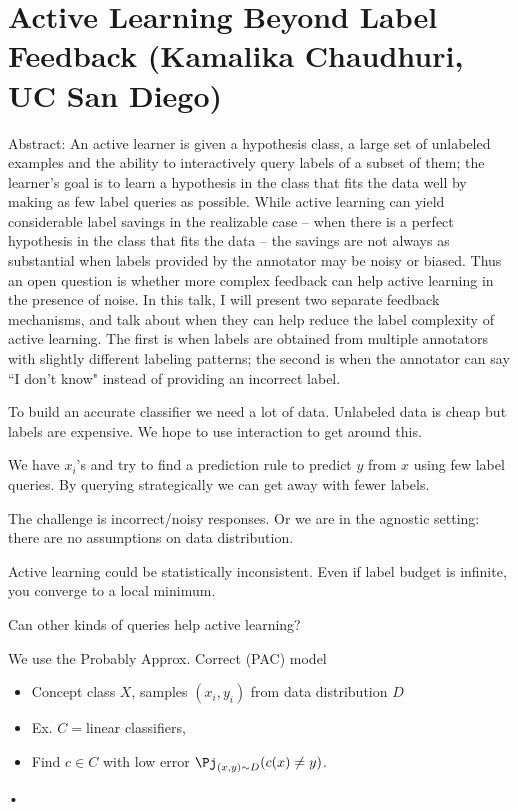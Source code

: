 \section{Active Learning Beyond Label Feedback (Kamalika Chaudhuri, UC San Diego)}

Abstract: An active learner is given a hypothesis class, a large set of unlabeled examples and the ability to interactively query labels of a subset of them; the learner's goal is to learn a hypothesis in the class that fits the data well by making as few label queries as possible. While active learning can yield considerable label savings in the realizable case -- when there is a perfect hypothesis in the class that fits the data -- the savings are not always as substantial when labels provided by the annotator may be noisy or biased. Thus an open question is whether more complex feedback can help active learning in the presence of noise. In this talk, I will present two separate feedback mechanisms, and talk about when they can help reduce the label complexity of active learning. The first is when labels are obtained from multiple annotators with slightly different labeling patterns; the second is when the annotator can say ``I don't know" instead of providing an incorrect label.


To build an accurate classifier we need a lot of data. Unlabeled data is cheap but labels are expensive.
We hope to use interaction to get around this.

We have $x_i$'s and try to find a prediction rule to predict $y$ from $x$ using few label queries.
By querying strategically we can get away with fewer labels.

The challenge is incorrect/noisy responses. Or we are in the agnostic setting: there are no assumptions on data distribution.

Active learning could be statistically inconsistent. Even if label budget is infinite, you converge to a local minimum.

Can other kinds of queries help active learning?

We use the Probably Approx. Correct (PAC) model
\begin{itemize}
\item
Concept class $X$, samples $(x_i,y_i)$ from data distribution $D$
\item
Ex. $C=$linear classifiers,
\item
Find $c\in C$ with low error $\Pj_{(x,y)\sim D} (c(x)\ne y)$. 
\end{itemize}•

